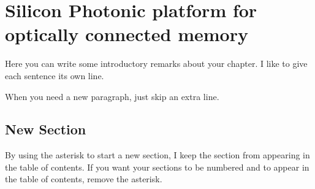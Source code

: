 
\pagestyle{plain}

\chapter[Silicon Photonic platform for optically connected memory][Top of Page Title]{Silicon Photonic platform for optically connected memory}

Here you can write some introductory remarks about your chapter.
I like to give each sentence its own line.

When you need a new paragraph, just skip an extra line.

\section{New Section}

By using the asterisk to start a new section, I keep the section from appearing in the table of contents.
If you want your sections to be numbered and to appear in the table of contents, remove the asterisk.

